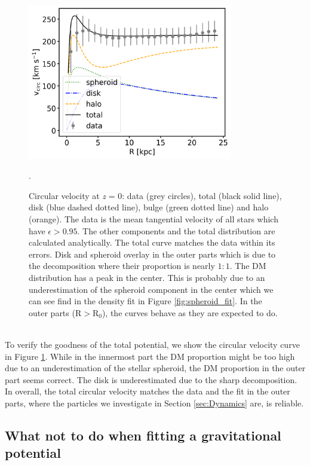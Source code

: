 \begin{figure}[htbp]
\captionsetup{format=plain}
\centering
\includegraphics[width=0.8\textwidth]{plots/Auriga/best_fit_circular_velocity_via_formula_snap_127.png}
\caption{Circular velocity at \textit{z} = 0: data (grey circles), total (black solid line), disk (blue dashed dotted line), bulge (green dotted line) and halo (orange). The data is the mean tangential velocity of all stars which have $\epsilon > 0.95$. The other components and the total distribution are calculated analytically. The total curve matches the data within its errors. Disk and spheroid overlay in the outer parts which is due to the decomposition where their proportion is nearly $1:1$. The \ac{DM} distribution has a peak in the center. This is probably due to an underestimation of the spheroid component in the center which we can see find in the density fit in Figure \ref{fig:spheroid_fit}. In the outer parts (R$>\mathrm{R}_0$), the curves behave as they are expected to do.}. \label{fig:circ_vel_fit}
\end{figure}
\\To verify the goodness of the total potential, we show the circular velocity curve in Figure \ref{fig:circ_vel_fit}. While in the innermost part the \ac{DM} proportion might be too high due to an underestimation of the stellar spheroid, the \ac{DM} proportion in the outer part seems correct. The disk is underestimated due to the sharp decomposition. In overall, the total circular velocity matches the data and the fit in the outer parts, where the particles we investigate in Section \ref{sec:Dynamics} are, is reliable.  

\subsection{What not to do when fitting a gravitational potential}\label{subsec:wrong_pot_fit}
